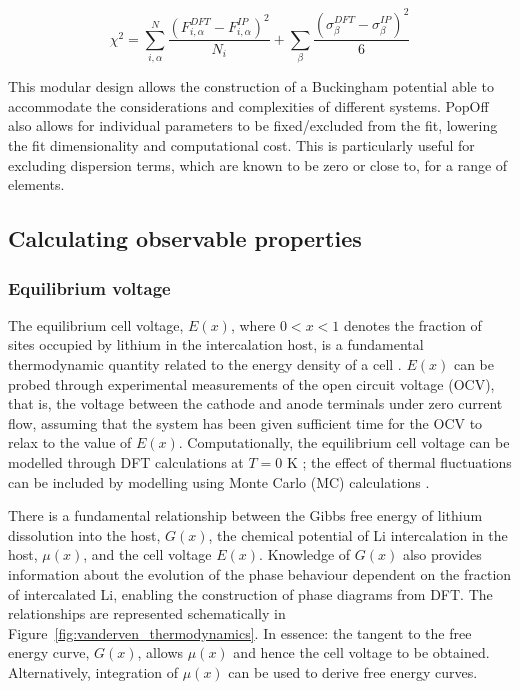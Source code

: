 \documentclass[../main.tex]{subfiles}
\begin{document}
\begin{equation}
    \chi^2 = \sum^{N}_{i,\alpha} \frac{(F^{DFT}_{i,\alpha} - F^{IP}_{i,\alpha})^2}{N_i} +  \sum_{\beta} \frac{(\sigma^{DFT}_{\beta} - \sigma^{IP}_{\beta})^2}{6}
\end{equation}

This modular design allows the construction of a Buckingham potential able to accommodate the considerations and complexities of different systems. PopOff also allows for individual parameters to be fixed/excluded from the fit, lowering the fit dimensionality and computational cost. This is particularly useful for excluding dispersion terms, which are known to be zero or close to, for a range of elements.\cite{Lee2013_lithium,fisher2008lithium}

\subsection{Calculating observable properties}
\subsubsection{Equilibrium voltage}
\label{sec:properties_equilibriumvoltage}
The equilibrium cell voltage, $E(x)$, where $0 < x < 1$ denotes the fraction of sites occupied by lithium in the intercalation host, is a fundamental thermodynamic quantity related to the energy density of a cell \cite{Urban2016,CEDER1999131,VanderVen2020}. $E(x)$ can be probed through experimental measurements of the open circuit voltage (OCV), that is, the voltage between the cathode and anode terminals under zero current flow, assuming that the system has been given sufficient time for the OCV to relax to the value of $E(x)$. Computationally, the equilibrium cell voltage can be modelled through DFT calculations at $T = 0$ K \cite{Urban2016,CEDER1999131,VanderVen2020}; the effect of thermal fluctuations can be included by modelling using Monte Carlo (MC) calculations \cite{mercer_influence_2017,Kim2001h}.

There is a fundamental relationship between the Gibbs free energy of lithium dissolution into the host, $G(x)$, the chemical potential of Li intercalation in the host, $\mu(x)$, and the cell voltage $E(x)$. Knowledge of $G(x)$ also provides information about the evolution of the phase behaviour dependent on the fraction of intercalated Li,\cite{CEDER1999131,persson2010,VanderVen2020,VanDerVen2000b} enabling the construction of phase diagrams from DFT. The relationships are represented schematically in Figure~\ref{fig:vanderven_thermodynamics}. In essence: the tangent to the free energy curve, $G(x)$, allows $\mu(x)$ and hence the cell voltage to be obtained. Alternatively, integration of $\mu(x)$ can be used to derive free energy curves.
\end{document}
